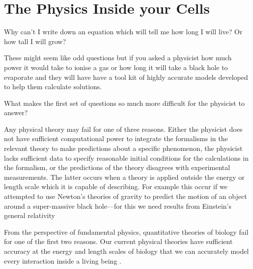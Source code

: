 

\section{The Physics Inside your Cells}

Why can't I write down an equation which will tell me how long I will live? Or how tall I will grow?

These might seem like odd questions but if you asked a physicist how much power it would take to ionise a gas or how long it will take a black hole to evaporate and they will have have a tool kit of highly accurate models developed to help them calculate solutions. 

What makes the first set of questions so much more difficult for the physicist to answer?

Any physical theory may fail for one of three reasons. Either the physicist does not have sufficient computational power to integrate the formalisms in the relevant theory to make predictions about a specific phenomenon, the physicist lacks sufficient data to specify reasonable initial conditions for the calculations in the formalism, or the predictions of the theory disagrees with experimental measurements. The latter occurs when a theory is applied outside the energy or length scale which it is capable of describing. For example this occur if we attempted to use Newton's theories of gravity to predict the motion of an object around a super-massive black hole---for this we need results from Einstein's general relativity \cite{picker2022} 

From the perspective of fundamental physics, quantitative theories of biology fail for one of the first two reasons. Our current physical theories have sufficient accuracy at the energy and length scales of biology that we can accurately model every interaction inside a living being \cite{carroll2021}. 

